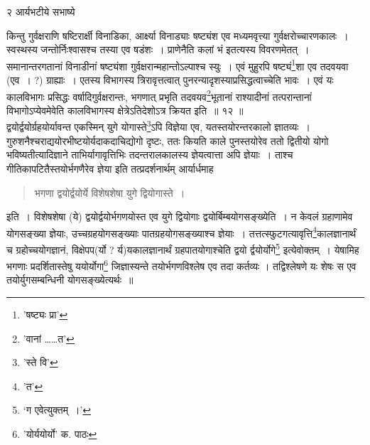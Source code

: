 \documentclass[11pt, openany]{book}
\makeatletter
\newcommand{\devanagarinumeral}[1]{%
	\devanagaridigits{\number\csname c@#1\endcsname}}
\makeatother
\begin{document}
\afterpage{\fancyhead[LE,RO]{\thepage}}
\cfoot{}

\newpage
\renewcommand{\thepage}{\devanagarinumeral{page}}
\setcounter{page}{2}


\vspace{3cm} २  \hspace{4cm}  आर्यभटीये सभाष्ये

\vspace{0.3cm} 
\noindent किन्तु गुर्वक्षराणि षष्टिरार्क्षी विनाडिका, आर्क्ष्या विनाड्याः षष्ट्यंश एव मध्यमवृत्त्या गुर्वक्षरोच्चारणकालः~। स्वस्थस्य जन्तोर्निःश्वासश्च तस्या एव षडंशः~। {\qt प्राणेनैति कलां भं} इतत्यस्य विवरणमेतत्~। समानान्तरगतानां विनाडीनां षष्ट्यंशा गुर्वक्षरान्महान्तोऽल्पाश्च स्युः~। एवं मुहुरपि षष्ट्यं\renewcommand{\thefootnote}{१}\footnote{'षष्ट्यः प्रा'}शा एव 
तदवयवा (एव~। ?) ग्राह्याः~। एतस्य विभागस्य त्रिरावृत्तत्वात् पुनरन्यादृशस्याप्रसिद्धत्वाच्चेति भावः~। एवं यः कालविभागः प्रसिद्धः
वर्षादिगुर्वक्षरान्तः, भगणात् प्रभृति तदवयव\renewcommand{\thefootnote}{२}\footnote{'वानां \ldots \ldots त'}भूतानां राश्यादीनां तत्परान्तानां विभागोऽप्येवमेवेति कालविभागस्य क्षेत्रेऽतिदेशोऽत्र क्रियत इति~॥ १\textendash२ ॥ \\

द्वयोर्द्वयोर्ग्रहयोर्यावन्त एकस्मिन् युगे योगास्ते\renewcommand{\thefootnote}{३}\footnote{'स्ते वि'}ऽपि विज्ञेया
एव, यतस्तयोरन्तरकालो ज्ञातव्यः~। गुरुशनैश्चराद्ययोरभीष्टयोर्यदाकदाचिद्योगो दृष्टः, ततः कियति काले पुनस्तयोरेव ततो द्वितीयो योगो भविष्यतीत्यादिज्ञाने ताभिर्यागावृत्तिभिः तदन्तरालकालस्य ज्ञेयत्वात्ता अपि ज्ञेयाः~। ताश्च गीतिकापटितैस्तयोर्भगणैरेव ज्ञेया इति
तत्प्रदर्शनार्थम् आर्यार्धमाह\textendash

\begin{quote}
{\ab भगणा द्वयोर्द्वयोर्ये विशेषशेषा युगे द्वियोगास्ते~।}
\end{quote}

इति~। विशेषशेषा (ये) द्वयोर्द्वयोर्भगणयोस्त एव युगे द्वियोगाः द्वयोर्बिम्बयोगसङ्ख्येति~। न केवलं ग्रहाणामेव योगसङ्ख्या ज्ञेयाः,
उच्चग्रहयोगसङ्ख्याः पातग्रहयोगसङ्ख्याश्च ज्ञेयाः~। तत्तत्स्फुटगत्यावृत्ति\renewcommand{\thefootnote}{४}\footnote{'त'}कालज्ञानार्थं च ग्रहोच्चयोगज्ञानं, विक्षेपप(र्यो ? र्य)यकालज्ञानार्थं ग्रहपातयोगाश्चेति द्वयो र्द्वयोर्योगे\renewcommand{\thefootnote}{५}\footnote{`ग एवेत्युक्तम्~।'} इत्येवोक्तम्~। येषामिह भगणाः प्रदर्शितास्तेषु
ययोर्योगा\renewcommand{\thefootnote}{६}\footnote{'योर्ययोर्यो' क. पाठः} जिज्ञास्यन्ते
तयोर्भगणविश्लेष एव तदा कर्तव्यः । तद्विश्लेषणे यः शेषः स एव तयोर्युगसम्बन्धिनी योगसङ्ख्येत्यर्थः~॥
\end{document}
